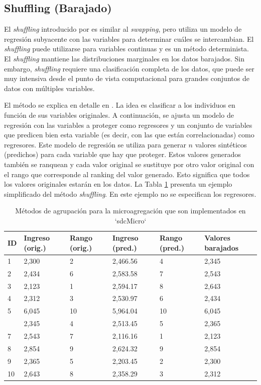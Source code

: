 \documentclass[]{book}
\theoremstyle{definition}
\theoremstyle{definition}
\theoremstyle{definition}
\theoremstyle{definition}
\theoremstyle{remark}
\begin{document}
\hypertarget{shuffling-barajado}{%
\subsection{Shuffling (Barajado)}\label{shuffling-barajado}}

El \emph{shuffling} introducido por \citep{MuSa06} es similar al \emph{swapping}, pero utiliza un modelo de regresión subyacente con las variables para determinar cuáles se intercambian. El \emph{shuffling} puede utilizarse para variables continuas y es un método determinista. El \emph{shuffling} mantiene las distribuciones marginales en los datos barajados. Sin embargo, \emph{shuffling} requiere una clasificación completa de los datos, que puede ser muy intensiva desde el punto de vista computacional para grandes conjuntos de datos con múltiples variables.

El método se explica en detalle en \citep{MuSa06}. La idea es clasificar a los individuos en función de sus variables originales. A continuación, se ajusta un modelo de regresión con las variables a proteger como regresores y un conjunto de variables que predicen bien esta variable (es decir, con las que están correlacionadas) como regresores. Este modelo de regresión se utiliza para generar \(n\) valores sintéticos (predichos) para cada variable que hay que proteger. Estos valores generados también se ranquean y cada valor original se sustituye por otro valor original con el rango que corresponde al ranking del valor generado. Esto significa que todos los valores originales estarán en los datos. La Tabla \ref{tab:Tabla19} presenta un ejemplo simplificado del método \emph{shuffling}. En este ejemplo no se especifican los regresores.

\begin{table}

\caption{\label{tab:Tabla19}\label{tab:Tabla19}Métodos de agrupación para la microagregación que son implementados en `sdcMicro`}
\centering
\begin{tabular}[t]{llllll}
\toprule
ID & Ingreso (orig.) & Rango (orig.) & Ingreso (pred.) & Rango (pred.) & Valores barajados\\
\midrule
1 & 2,300 & 2 & 2,466.56 & 4 & 2,345\\
2 & 2,434 & 6 & 2,583.58 & 7 & 2,543\\
3 & 2,123 & 1 & 2,594.17 & 8 & 2,643\\
4 & 2,312 & 3 & 2,530.97 & 6 & 2,434\\
5 & 6,045 & 10 & 5,964.04 & 10 & 6,045\\
\addlinespace
6 & 2,345 & 4 & 2,513.45 & 5 & 2,365\\
7 & 2,543 & 7 & 2,116.16 & 1 & 2,123\\
8 & 2,854 & 9 & 2,624.32 & 9 & 2,854\\
9 & 2,365 & 5 & 2,203.45 & 2 & 2,300\\
10 & 2,643 & 8 & 2,358.29 & 3 & 2,312\\
\bottomrule
\end{tabular}
\end{table}
\end{document}
